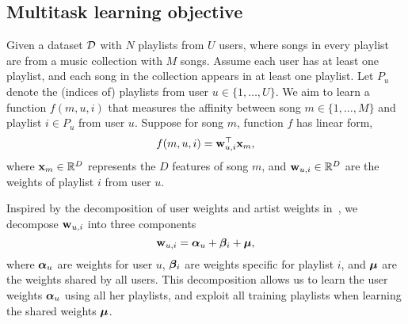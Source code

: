 \subsection{Multitask learning objective}

Given a dataset $\mathcal{D}$ with $N$ playlists from $U$ users, 
where songs in every playlist are from a music collection with $M$ songs.
Assume each user has at least one playlist, and each song in the collection 
appears in at least one playlist.
%
Let $P_u$ denote the (indices of) playlists from user $u \in \{1,\dots,U\}$.
We aim to learn a function $f(m, u, i)$ that measures the affinity between 
song $m \in \{1,\dots,M\}$ and playlist $i \in P_u$ from user $u$.
Suppose for song $m$, function $f$ has linear form,
\begin{equation}
\label{eq:scorefunc}
f(m, u, i) = \mathbf{w}_{u,i}^\top \mathbf{x}_m,
\end{equation}
where %
$\mathbf{x}_m \in \mathbb{R}^D$ represents the $D$ features of song $m$,
and $\mathbf{w}_{u,i} \in \mathbb{R}^D$ are the weights %
of playlist $i$ from user $u$.



Inspired by the decomposition of user weights and artist weights in~\cite{ben2017groove},
we decompose $\mathbf{w}_{u,i}$ %
into three components
\begin{equation}
\label{eq:decomp}
\mathbf{w}_{u, i} = {\bm{\alpha}}_u + {\bm{\beta}}_i + \bm{\mu},
\end{equation}
where ${\bm{\alpha}}_u$ are weights for user $u$,
${\bm{\beta}}_i$ are weights specific for playlist $i$, %
and $\bm{\mu}$ are the weights shared by all users.
This decomposition allows us to learn the user weights ${\bm{\alpha}}_u$ using all her
playlists, and exploit all training playlists when learning the shared weights $\bm{\mu}$.

%

